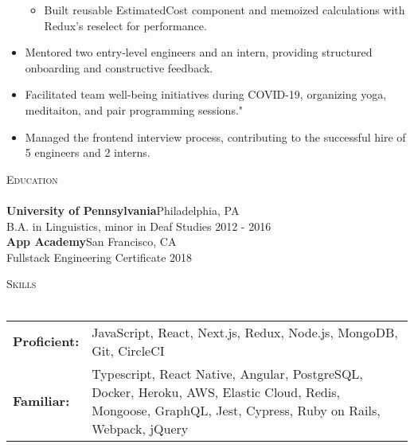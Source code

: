 \documentclass[a4paper]{article}
\newcommand{\header}[1]{
    {\hspace*{-18pt}\vspace*{3pt} \textcolor{deeppurple}{\textsc{#1}}}
    \vspace*{-12pt} \\
    \hspace*{-18pt} \textcolor{deeppurple}{\hrulefill} \\
}
\begin{document}
\begin{itemize}
\begin{itemize}
        \item Built reusable EstimatedCost component and memoized calculations with Redux's reselect for performance.
    \end{itemize}
    \item Mentored two entry-level engineers and an intern, providing structured onboarding and constructive feedback.
    \item Facilitated team well-being initiatives during COVID-19, organizing yoga, meditaiton, and pair programming sessions."
    \item Managed the frontend interview process, contributing to the successful hire of 5 engineers and 2 interns.
\end{itemize}

\header{Education}
\textbf{University of Pennsylvania}\hfill Philadelphia, PA\\
B.A. in Linguistics, minor in Deaf Studies \hfill 2012 - 2016\\
\vspace{2mm}
\textbf{App Academy}\hfill San Francisco, CA\\
Fullstack Engineering Certificate \hfill 2018\\
\vspace{2mm}

\header{Skills}
\vspace{1mm}
\begin{tabular}{ l p{5.2in} }
    \textbf{Proficient:} & JavaScript, React, Next.js, Redux, Node.js, MongoDB, Git, CircleCI \\
    \textbf{Familiar:}   & Typescript, React Native, Angular, PostgreSQL, Docker, Heroku, AWS, Elastic Cloud, Redis, Mongoose, GraphQL, Jest, Cypress, Ruby on Rails, Webpack, jQuery \\
\end{tabular}
\end{document}
